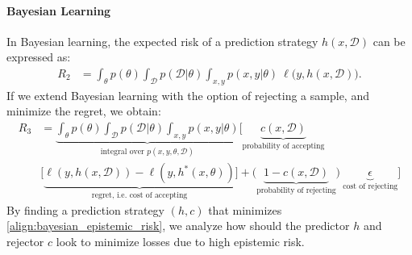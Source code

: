 \paragraph{Bayesian Learning}
In Bayesian learning, the expected risk of a prediction strategy $h(x,\mathcal{D})$ can be expressed as:
\begin{align}
R_{2} &= \int_{\theta} p(\theta) \int_{\mathcal{D}} p(\mathcal{D}|\theta)\int_{x,y} p(x,y|\theta)\  \ell\big(y,h(x,\mathcal{D})\big).
\end{align}
If we extend Bayesian learning with the option of rejecting a sample, and minimize the regret, we obtain:
\begin{align}
\label{align:bayesian_epistemic_risk}
R_{3} &= \underbrace{\int_{\theta} p(\theta) 
\int_{\mathcal{D}} p(\mathcal{D}|\theta)
\int_{x,y} p(x,y|\theta)}_{\text{integral over }p(x,y,\theta,\mathcal{D})} \Bigg[\underbrace{c(x,\mathcal{D})}_{\text{probability of accepting}} \\
& \bigg[ \underbrace{\ell(y,h(x,\mathcal{D})) - \ell(y,h^*(x,\theta))}_{\text{regret, i.e. cost of accepting}} \bigg] \nonumber
+ \big(\underbrace{1 - c(x,\mathcal{D})}_{\text{probability of rejecting}}\big)\ \underbrace{\epsilon}_{\text{cost of rejecting}} 
\Bigg]
\end{align}
By finding a prediction strategy $(h, c)$ that minimizes \eqref{align:bayesian_epistemic_risk}, we analyze how should the predictor $h$ and rejector $c$ look to minimize losses due to high epistemic risk.

